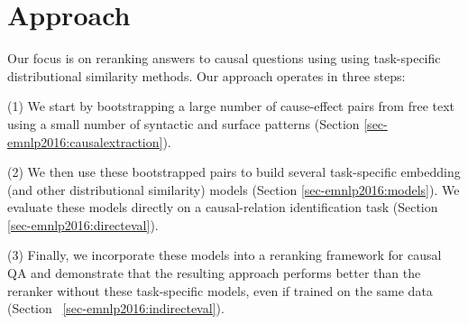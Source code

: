 \section{Approach}
\label{sec-emnlp2016:approach}

Our focus is on reranking answers to causal questions using using task-specific distributional similarity methods.
%
Our approach operates in three steps:

{\flushleft (1)} We start by bootstrapping a large number of cause-effect pairs from free text using a small number of syntactic and surface patterns (Section \ref{sec-emnlp2016:causalextraction}).

{\flushleft (2)} We then use these bootstrapped pairs to build several task-specific embedding (and other distributional similarity) models (Section \ref{sec-emnlp2016:models}). We evaluate these models directly on a causal-relation identification task (Section \ref{sec-emnlp2016:directeval}).  

{\flushleft (3)} Finally, we incorporate these models into a reranking framework for causal QA and demonstrate that the resulting approach performs better than the reranker without these task-specific models, even if trained on the same data (Section ~\ref{sec-emnlp2016:indirecteval}).  




